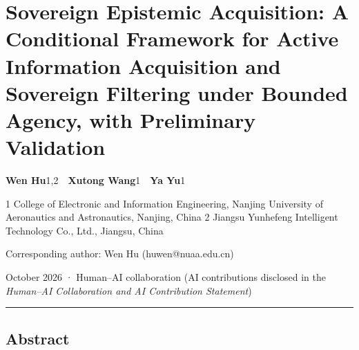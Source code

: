 \documentclass[
  11pt]{article}
\author{}
\date{23 October 2026}
\begin{document}
\section{Sovereign Epistemic Acquisition: A Conditional Framework for
Active Information Acquisition and Sovereign Filtering under Bounded
Agency, with Preliminary
Validation}\label{sovereign-epistemic-acquisition-a-conditional-framework-for-active-information-acquisition-and-sovereign-filtering-under-bounded-agency-with-preliminary-validation}

\textbf{Wen Hu}1,2~~\textbf{Xutong Wang}1~~\textbf{Ya Yu}1

1 College of Electronic and Information Engineering, Nanjing University
of Aeronautics and Astronautics, Nanjing, China 2 Jiangsu Yunhefeng
Intelligent Technology Co., Ltd., Jiangsu, China

Corresponding author: Wen Hu (huwen@nuaa.edu.cn)

October 2026 · Human--AI collaboration (AI contributions disclosed in
the \emph{Human--AI Collaboration and AI Contribution Statement})

\begin{center}\rule{0.5\linewidth}{0.5pt}\end{center}

\subsection{Abstract}\label{abstract}
\end{document}
